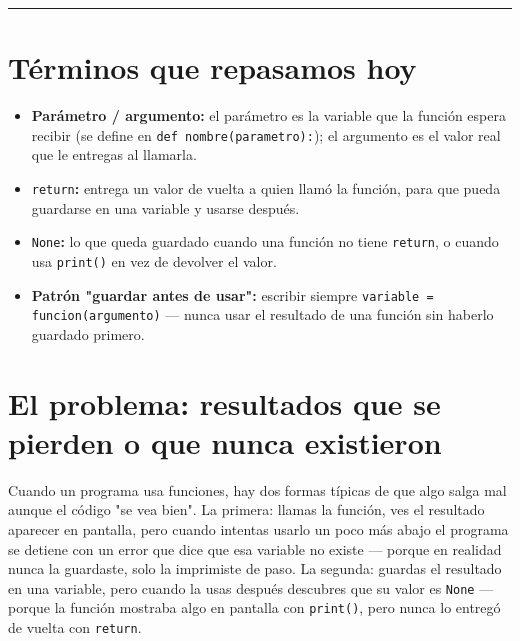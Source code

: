 \documentclass[11pt]{article}
\begin{document}
\vfill
\begin{center}
    \rule{\textwidth}{0.4pt}
\end{center}

\newpage

\section*{Términos que repasamos hoy}

\begin{formulabox}
\begin{itemize}
  \item \textbf{Parámetro / argumento:} el parámetro es la variable que la función espera recibir (se define en \texttt{def nombre(parametro):}); el argumento es el valor real que le entregas al llamarla.
  \item \texttt{return}\textbf{:} entrega un valor de vuelta a quien llamó la función, para que pueda guardarse en una variable y usarse después.
  \item \texttt{None}\textbf{:} lo que queda guardado cuando una función no tiene \texttt{return}, o cuando usa \texttt{print()} en vez de devolver el valor.
  \item \textbf{Patrón "guardar antes de usar":} escribir siempre \texttt{variable = funcion(argumento)} --- nunca usar el resultado de una función sin haberlo guardado primero.
\end{itemize}
\end{formulabox}

\section*{El problema: resultados que se pierden o que nunca existieron}

Cuando un programa usa funciones, hay dos formas típicas de que algo salga mal aunque el código "se vea bien". La primera: llamas la función, ves el resultado aparecer en pantalla, pero cuando intentas usarlo un poco más abajo el programa se detiene con un error que dice que esa variable no existe --- porque en realidad nunca la guardaste, solo la imprimiste de paso. La segunda: guardas el resultado en una variable, pero cuando la usas después descubres que su valor es \texttt{None} --- porque la función mostraba algo en pantalla con \texttt{print()}, pero nunca lo entregó de vuelta con \texttt{return}.
\end{document}
